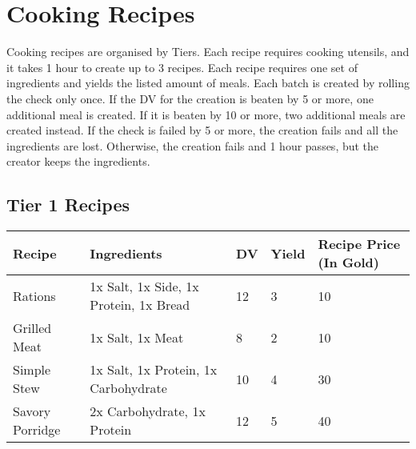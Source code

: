 \section{Cooking Recipes}\label{sec:cookingRecipes}
Cooking recipes are organised by Tiers.
Each recipe requires cooking utensils, and it takes 1 hour to create up to 3 recipes.
Each recipe requires one set of ingredients and yields the listed amount of meals.
Each batch is created by rolling the check only once.
If the DV for the creation is beaten by 5 or more, one additional meal is created.
If it is beaten by 10 or more, two additional meals are created instead.
If the check is failed by 5 or more, the creation fails and all the ingredients are lost.
Otherwise, the creation fails and 1 hour passes, but the creator keeps the ingredients.\\


\subsection{Tier 1 Recipes}
\begin{longtable}{l | p{2.5cm} | l | p{1cm} | p{1cm} }
	Recipe & Ingredients & DV & Yield & Recipe Price (In Gold)\\ \hline
	Rations & 1x Salt, 1x Side, 1x Protein, 1x Bread & 12 & 3 & 10\\
	Grilled Meat & 1x Salt, 1x Meat & 8 & 2 & 10\\
	Simple Stew & 1x Salt, 1x Protein, 1x Carbohydrate & 10 & 4 & 30\\
	Savory Porridge & 2x Carbohydrate, 1x Protein & 12 & 5 & 40\\
\end{longtable}